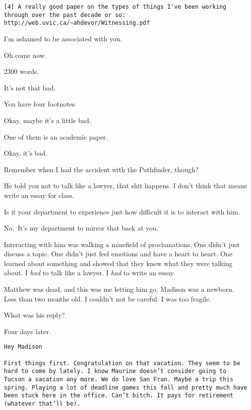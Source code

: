 \begin{paracol}{2}
\begin{leftcolumn}
\begin{verbatim}
[4] A really good paper on the types of things I've been working through over the past decade or so: http://web.uvic.ca/~ahdevor/Witnessing.pdf
\end{verbatim}

\begin{ally}
I'm ashamed to be associated with you.
\end{ally}
Oh come now.

\begin{ally}
2300 words.
\end{ally}
It's not that bad.

\begin{ally}
You have four footnotes
\end{ally}
Okay, maybe it's a little bad.

\begin{ally}
One of them is an academic paper.
\end{ally}
Okay, it's bad.

Remember when I had the accident with the Pathfinder, though?

\begin{ally}
He told you not to talk like a lawyer, that shit happens. I don't think that means write an essay for class.
\end{ally}
Is it your department to experience just how difficult it is to interact with him.

\begin{ally}
No.~It's my department to mirror that back at you.
\end{ally}
Interacting with him was walking a minefield of proclamations. One didn't just discuss a topic. One didn't just feel emotions and have a heart to heart. One learned about something and showed that they knew what they were talking about. I \emph{had} to talk like a lawyer. I \emph{had} to write an essay.

Matthew was dead, and this was me letting him go. Madison was a newborn. Less than two months old. I couldn't not be careful. I was too fragile.

\begin{ally}
What was his reply?
\end{ally}
Four days later.

\begin{verbatim}
Hey Madison

First things first. Congratulation on that vacation. They seem to be hard to come by lately. I know Maurine doesn’t consider going to Tucson a vacation any more. We do love San Fran. Maybe a trip this spring. Playing a lot of deadline games this fall and pretty much have been stuck here in the office. Can’t bitch. It pays for retirement (whatever that’ll be).


\end{verbatim}
\end{leftcolumn}
\end{paracol}
